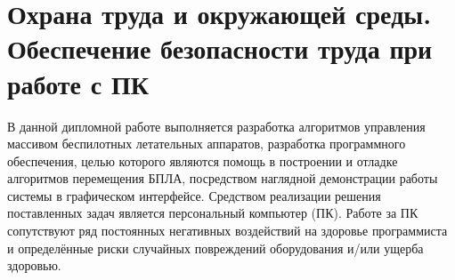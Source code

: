 \newpage
\section{Охрана труда и окружающей среды.
Обеспечение безопасности труда при работе с ПК}

В данной дипломной работе выполняется разработка алгоритмов управления
массивом беспилотных летательных аппаратов, разработка программного обеспечения, 
целью которого являются помощь в построении и отладке алгоритмов
перемещения БПЛА, посредством наглядной демонстрации работы системы в графическом
интерфейсе. Средством реализации решения поставленных задач является персональный компьютер (ПК).
Работе за ПК сопутствуют ряд постоянных негативных воздействий на здоровье программиста и
определённые риски случайных повреждений оборудования и/или ущерба здоровью.
